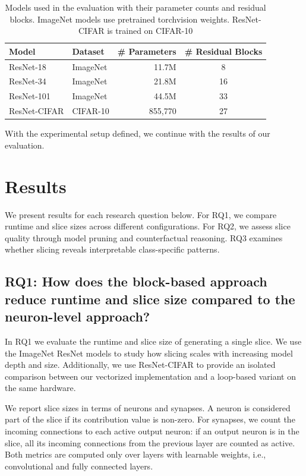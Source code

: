 \documentclass[
12pt,
fancyheadings,
a4paper,
twoside,
BCOR=0.7cm,
nobcorignoretitle,
grayscalebody,
]{stsreprt}
\begin{document}
\begin{table}[ht]
\centering
\caption{Models used in the evaluation with their parameter counts and residual blocks. ImageNet models use pretrained torchvision weights. ResNet-CIFAR is trained on CIFAR-10}
\label{tab:model_parameters}
\begin{tabular}{l l r c}
\toprule
\textbf{Model} & \textbf{Dataset} & \textbf{\# Parameters} & \textbf{\# Residual Blocks} \\
\midrule
ResNet-18   & ImageNet & 11.7M   & 8  \\
ResNet-34   & ImageNet & 21.8M   & 16 \\
ResNet-101  & ImageNet & 44.5M   & 33 \\
\midrule
ResNet-CIFAR & CIFAR-10 & 855{,}770 & 27 \\
\bottomrule
\end{tabular}
\end{table}

\noindent

With the experimental setup defined, we continue with the results of our evaluation.

\section{Results}

We present results for each research question below.
For RQ1, we compare runtime and slice sizes across different configurations.
For RQ2, we assess slice quality through model pruning and counterfactual reasoning.
RQ3 examines whether slicing reveals interpretable class-specific patterns.

\subsection*{RQ1: How does the block-based approach reduce runtime and slice size compared to the neuron-level approach?}

In RQ1 we evaluate the runtime and slice size of generating a single slice.
We use the ImageNet ResNet models to study how slicing scales with increasing model depth and size.
Additionally, we use ResNet-CIFAR to provide an isolated comparison between our vectorized
implementation and a loop-based variant on the same hardware.

We report slice sizes in terms of neurons and synapses.
A neuron is considered part of the slice if its contribution value is non-zero.
For synapses, we count the incoming connections to each active output neuron: if an output neuron
is in the slice, all its incoming connections from the previous layer are counted as active.
Both metrics are computed only over layers with learnable weights, i.e., convolutional and fully
connected layers.
\end{document}
